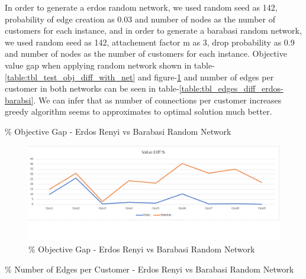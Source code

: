 \documentclass[11pt]{article}
\begin{document}
In order to generate a erdos random network, we used random seed as 142, probability of edge creation as 0.03 and number of nodes as the number of customers for each instance, and in order to generate a barabasi random network, we used random seed as 142, attachement factor m as 3, drop probability as 0.9 and number of nodes as the number of customers for each instance.
Objective value gap when applying random network shown in table-\ref{table:tbl_test_obj_diff_with_net} and figure-\ref{fig:fig_value_diff_with_net} and number of edges per customer in both networks can be seen in table-\ref{table:tbl_edges_diff_erdos-barabsi}. We can infer that as number of connections per customer increases greedy algorithm seems to approximates to optimal solution much better. 

\begin{table}[htb]
        \centering
        \caption[Short Caption for LoT]{\% Objective Gap - Erdos Renyi vs Barabasi Random Network }\label{table:tbl_test_obj_diff_with_net}
\end{table}
\begin{figure}[htp]
    \centering
    \includegraphics[width=12cm]{value_diff_with_net}
    \caption{\% Objective Gap  - Erdos Renyi vs Barabasi Random Network}
    \label{fig:fig_value_diff_with_net}
\end{figure}
\begin{table}[htb]
        \centering
        \caption[Short Caption for LoT]{\% Number of Edges per Customer - Erdos Renyi vs Barabasi Random Network }\label{table:tbl_edges_diff_erdos-barabsi}
\end{table}



\newpage
\end{document}

